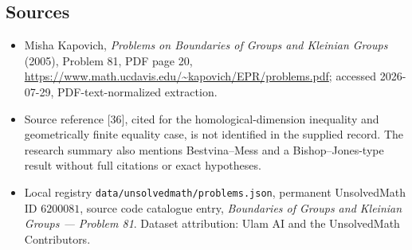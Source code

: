 \documentclass[11pt]{article}
\begin{document}
\subsection{Sources}
\begin{itemize}
\item Misha Kapovich, \emph{Problems on Boundaries of Groups and Kleinian Groups} (2005), Problem 81, PDF page 20, \url{https://www.math.ucdavis.edu/~kapovich/EPR/problems.pdf}; accessed 2026-07-29, PDF-text-normalized extraction.
\item Source reference [36], cited for the homological-dimension inequality and geometrically finite equality case, is not identified in the supplied record. The research summary also mentions Bestvina--Mess and a Bishop--Jones-type result without full citations or exact hypotheses.
\item Local registry \texttt{data/unsolvedmath/problems.json}, permanent UnsolvedMath ID $6200081$, source code catalogue entry, \emph{Boundaries of Groups and Kleinian Groups --- Problem 81}. Dataset attribution: Ulam AI and the UnsolvedMath Contributors.
\end{itemize}
\end{document}
